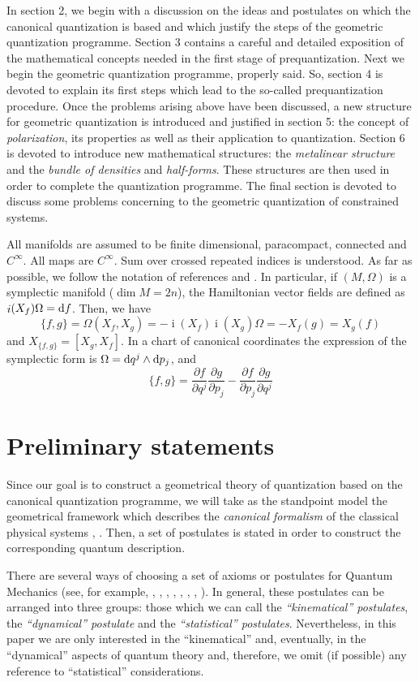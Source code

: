 \documentclass[12pt]{article}
\def\derpar#1#2{\frac{\partial{#1}}{\partial{#2}}}
\def\d{{\rm d}}
\def\inn{\mathop{i}\nolimits}
\begin{document}
In section 2, we begin with a discussion on the ideas and postulates on
which the canonical
quantization is based and which justify the steps of the geometric
quantization programme.
Section 3 contains a careful and detailed exposition
of the mathematical concepts needed in the first stage of
prequantization.
Next we begin the geometric quantization programme, properly said.
So, section 4 is devoted to explain its first steps
which lead to the so-called prequantization procedure.
Once the problems arising above have been discussed,
a new structure for geometric quantization is introduced and justified
in section 5: the concept of {\it polarization}, its
properties as well as their application to quantization.
Section 6 is devoted to introduce new mathematical structures:
the {\it metalinear structure} and the {\it bundle of densities} and
{\it half-forms}.
These structures are then used in order to complete the quantization
programme.
The final section is devoted to discuss some problems concerning to
the geometric quantization of constrained systems.

All manifolds are assumed to be finite dimensional,
paracompact, connected and $C^\infty$. All maps are $C^\infty$.
Sum over crossed repeated indices is understood.
As far as possible, we follow the notation of references
\cite{AM-78} and \cite{AMR-mtaa}.
In particular, if $(M,\Omega )$ is a symplectic manifold ($\dim M =
2n$),
the Hamiltonian vector fields are defined as $\inn(X_f)\Omega = \d f$.
Then, we have
$$
\{ f,g \} = \Omega (X_f,X_g) =-\inn(X_f)\inn(X_g)\Omega =-X_f(g) =
X_g(f)
$$
and $X_{\{f,g\}} =[X_g,X_f]$.
In a chart of canonical coordinates the expression of the symplectic
form is
$\Omega = \d q^j \wedge \d p_j$, and
$$
\{ f,g \} =
\derpar{f}{q^j}\derpar{g}{p_j}-\derpar{f}{p_j}\derpar{g}{q^j}
$$



\section{Preliminary statements}


Since our goal is to construct a geometrical theory
of quantization based on the canonical quantization programme,
we will take as the standpoint model
the geometrical framework which describes the {\it canonical formalism}
of the classical physical systems  \cite{AM-78}, \cite{Ar-mmmc}.
Then, a set of postulates is stated in order to construct
the corresponding quantum description.

There are several ways of choosing a set of axioms
or postulates for Quantum Mechanics (see, for example,
\cite{CDL-77}, \cite{Di-pqm}, \cite{GP-78}, \cite{Ja-fqm},
\cite{Mk-mfqm},
\cite{Mo-qmdo}, \cite{Se-pgqm}, \cite{Vn-mfqm}).
In general, these postulates can be arranged into three groups:
those which we can call the {\it ``kinematical'' postulates},
the {\it``dynamical'' postulate} and the {\it ``statistical''
postulates}.
Nevertheless, in this paper we are only interested in the
``kinematical'' and,
eventually, in the ``dynamical'' aspects of quantum theory
and, therefore, we omit (if possible) any reference to ``statistical''
considerations.
\end{document}
